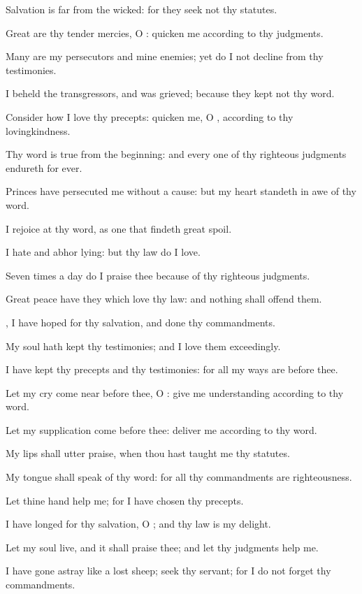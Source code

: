 \verse Salvation is far from the wicked: for they seek not thy statutes.

\verse Great are thy tender mercies, O \LORD: quicken me according to thy judgments.

\verse Many are my persecutors and mine enemies; yet do I not decline from thy testimonies.

\verse I beheld the transgressors, and was grieved; because they kept not thy word.

\verse Consider how I love thy precepts: quicken me, O \LORD, according to thy lovingkindness.

\verse Thy word is true from the beginning: and every one of thy righteous judgments endureth for ever.

\verse Princes have persecuted me without a cause: but my heart standeth in awe of thy word.

\verse I rejoice at thy word, as one that findeth great spoil.

\verse I hate and abhor lying: but thy law do I love.

\verse Seven times a day do I praise thee because of thy righteous judgments.

\verse Great peace have they which love thy law: and nothing shall offend them.

\verse \LORD, I have hoped for thy salvation, and done thy commandments.

\verse My soul hath kept thy testimonies; and I love them exceedingly.

\verse I have kept thy precepts and thy testimonies: for all my ways are before thee.

\verse Let my cry come near before thee, O \LORD: give me understanding according to thy word.

\verse Let my supplication come before thee: deliver me according to thy word.

\verse My lips shall utter praise, when thou hast taught me thy statutes.

\verse My tongue shall speak of thy word: for all thy commandments are righteousness.

\verse Let thine hand help me; for I have chosen thy precepts.

\verse I have longed for thy salvation, O \LORD; and thy law is my delight.

\verse Let my soul live, and it shall praise thee; and let thy judgments help me.

\verse I have gone astray like a lost sheep; seek thy servant; for I do not forget thy commandments.




